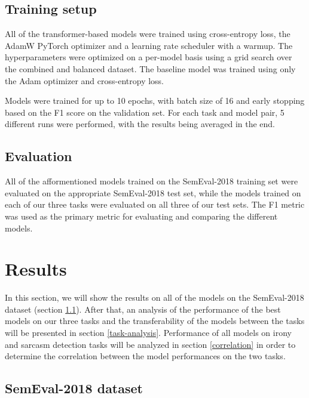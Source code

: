 \documentclass[10pt, a4paper]{article}
\begin{document}
\subsection{Training setup}

All of the transformer-based models were trained using cross-entropy loss, the AdamW PyTorch optimizer and a
learning rate scheduler with a warmup. The hyperparameters were optimized on a per-model basis using a grid 
search over the combined and balanced dataset. The baseline model
was trained using only the Adam optimizer and cross-entropy loss.

Models were trained for up to 10 epochs, with batch size of 16 and early stopping based on the F1 score on the validation set.
For each task and model pair, 5 different runs were performed, with the results being averaged in the end.

\subsection{Evaluation}
All of the afformentioned models trained on the SemEval-2018 training set were evaluated on the appropriate 
SemEval-2018 test set, while the models trained on each of our three tasks were evaluated on all three of our test sets. 
The F1 metric was used as the primary metric for evaluating and comparing the different models.

\section{Results}

In this section, we will show the results on all of the models on the SemEval-2018 dataset (section \ref{semeval-results}).
After that, an analysis of the performance of the best models on our three tasks and the transferability of the models between
the tasks will be presented in section \ref{task-analysis}. Performance of all models on irony and sarcasm detection tasks
will be analyzed in section \ref{correlation} in order to determine the correlation between the model performances on the two tasks.

\subsection{SemEval-2018 dataset}\label{semeval-results}
\end{document}

